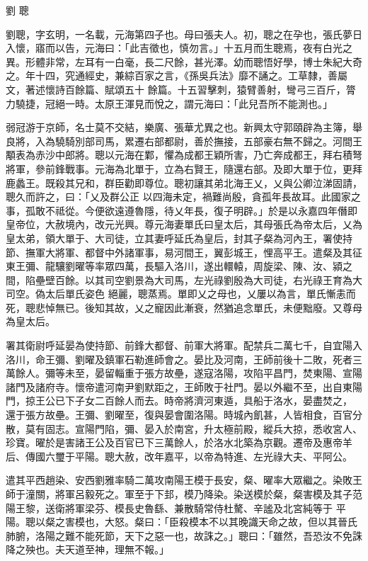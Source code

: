 
\begin{pinyinscope}

 劉
 聰



 劉聰，字玄明，一名載，元海第四子也。母曰張夫人。初，聰之在孕也，張氏夢日入懷，寤而以告，元海曰：「此吉徵也，慎勿言。」十五月而生聰焉，夜有白光之異。形體非常，左耳有一白毫，長二尺餘，甚光澤。幼而聰悟好學，博士朱紀大奇之。年十四，究通經史，兼綜百家之言，《孫吳兵法》靡不誦之。工草隸，善屬文，著述懷詩百餘篇、賦頌五十
 餘篇。十五習擊刺，猿臂善射，彎弓三百斤，膂力驍捷，冠絕一時。太原王渾見而悅之，謂元海曰：「此兒吾所不能測也。」



 弱冠游于京師，名士莫不交結，樂廣、張華尤異之也。新興太守郭頤辟為主簿，舉良將，入為驍騎別部司馬，累遷右部都尉，善於撫接，五部豪右無不歸之。河間王顒表為赤沙中郎將。聰以元海在鄴，懼為成都王穎所害，乃亡奔成都王，拜右積弩將軍，參前鋒戰事。元海為北單于，立為右賢王，隨還右部。及即大單于位，更拜鹿蠡王。既殺其兄和，群臣勸即尊位。聰初讓其弟北海王乂，乂與公卿泣涕固請，聰久而許之，曰：「乂及群公正
 以四海未定，禍難尚殷，貪孤年長故耳。此國家之事，孤敢不祗從。今便欲遠遵魯隱，待乂年長，復子明辟。」於是以永嘉四年僭即皇帝位，大赦境內，改元光興。尊元海妻單氏曰皇太后，其母張氏為帝太后，乂為皇太弟，領大單于、大司徒，立其妻呼延氏為皇后，封其子粲為河內王，署使持節、撫軍大將軍、都督中外諸軍事，易河間王，翼彭城王，悝高平王。遣粲及其征東王彌、龍驤劉曜等率眾四萬，長驅入洛川，遂出轘轅，周旋梁、陳、汝、潁之間，陷壘壁百餘。以其司空劉景為大司馬，左光祿劉殷為大司徒，右光祿王育為大司空。偽太后單氏姿色
 絕麗，聰蒸焉。單即乂之母也，乂屢以為言，單氏慚恚而死，聰悲悼無已。後知其故，乂之寵因此漸衰，然猶追念單氏，未便黜廢。又尊母為皇太后。



 署其衛尉呼延晏為使持節、前鋒大都督、前軍大將軍。配禁兵二萬七千，自宜陽入洛川，命王彌、劉曜及鎮軍石勒進師會之。晏比及河南，王師前後十二敗，死者三萬餘人。彌等未至，晏留輜重于張方故壘，遂寇洛陽，攻陷平昌門，焚東陽、宣陽諸門及諸府寺。懷帝遣河南尹劉默距之，王師敗于社門。晏以外繼不至，出自東陽門，掠王公已下子女二百餘人而去。時帝將濟河東遁，具船于洛水，晏盡焚之，
 還于張方故壘。王彌、劉曜至，復與晏會圍洛陽。時城內飢甚，人皆相食，百官分散，莫有固志。宣陽門陷，彌、晏入於南宮，升太極前殿，縱兵大掠，悉收宮人、珍寶。曜於是害諸王公及百官已下三萬餘人，於洛水北築為京觀。遷帝及惠帝羊后、傳國六璽于平陽。聰大赦，改年嘉平，以帝為特進、左光祿大夫、平阿公。



 遣其平西趙染、安西劉雅率騎二萬攻南陽王模于長安，粲、曜率大眾繼之。染敗王師于潼關，將軍呂毅死之。軍至于下邽，模乃降染。染送模於粲，粲害模及其子范陽王黎，送衛將軍梁芬、模長史魯繇、兼散騎常侍杜驁、辛謐及北宮純等于
 平陽。聰以粲之害模也，大怒。粲曰：「臣殺模本不以其晚識天命之故，但以其晉氏肺腑，洛陽之難不能死節，天下之惡一也，故誅之。」聰曰：「雖然，吾恐汝不免誅降之殃也。夫天道至神，理無不報。」




\end{pinyinscope}

